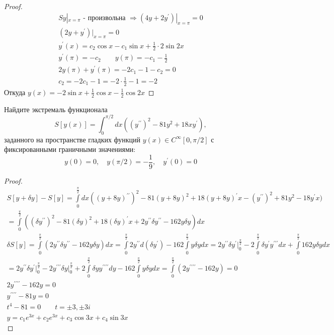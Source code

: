 \begin{proof}
\begin{gather*}
    Sy|_{x = \pi} \text{ - произвольна } \Rightarrow (4y + 2y^{\prime})|_{x = \pi} = 0\\
    (2y + y^{\prime})|_{x = \pi} = 0\\
    y^{\prime}(x) = c_2 \cos x - c_1 \sin x + \frac{1}{2} \cdot 2 \sin 2x\\
    y^{\prime}(\pi) = -c_2\qquad y(\pi) = -c_1 - \frac{1}{2}\\
    2y(\pi) + y^{\prime}(\pi) = -2c_1 - 1 - c_2 = 0\\
    c_2 = -2c_1 - 1= -2 \cdot \frac{1}{2} - 1 = -2
\end{gather*}
Откуда $y(x) = -2\sin x + \frac{1}{2} \cos x - \frac{1}{2} \cos 2x$
\end{proof}
\vskip 0.6in





\begin{prob}
Найдите экстремаль функционала
$$
S[y(x)]=\int_0^{\pi / 2} d x\left(\left(y^{\prime \prime}\right)^2-81 y^2+18 x y^{\prime}\right),
$$
заданного на пространстве гладких функций $y(x) \in C^{\infty}[0, \pi / 2]$ с фиксированными граничными значениями:
$$
y(0) = 0, \quad
y(\pi / 2) = -\frac{1}{9}, \quad
y^{\prime}(0) = 0
$$
\end{prob}

\begin{proof}
\begin{gather*}
    S[y + \delta y] - S[y]
    = \int\limits_{0}^{\frac{\pi}{2}} dx ((y + 8y)^{\prime\prime})^2 - 81(y + 8y)^2 + 18(y+8y)^{\prime}x - (y^{\prime\prime})^2 + 81y^2 - 18y^{\prime}x)\\
    = \int\limits_{0}^{\frac{\pi}{2}} ((\delta y^{\prime \prime})^2 - 81(\delta y)^2 + 18(\delta y)^{\prime} x + 2y^{\prime\prime} \delta y^{\prime\prime} - 162y \delta y )dx\\
    \delta S[y]
    = \int\limits_{0}^{\frac{\pi}{2}} (2y^{\prime\prime} \delta y^{\prime\prime} - 162 y \delta y)dx
    = \int\limits_{0}^{\frac{\pi}{2}} 2y^{\prime\prime} d(\delta y^{\prime}) - 162 \int\limits_{0}^{\frac{\pi}{2}} y \delta y dx
    = 2y^{\prime\prime} \delta y^{\prime} \bigg|_{0}^{\frac{\pi}{2}}
    - 2\int\limits_{0}^{\frac{\pi}{2}} \delta y^{\prime} y^{\prime\prime\prime} dx
    + \int\limits_{0}^{\frac{\pi}{2}} 162 y \delta y dx\\
    = 2y^{\prime\prime} \delta y^{\prime} \bigg|_{0}^{\frac{\pi}{2}}
    - 2y^{\prime\prime\prime} \delta y |_{0}^{\frac{\pi}{2}}
    + 2\int\limits_{0}^{\frac{\pi}{2}} \delta y y^{\prime\prime\prime\prime} dy
    - 162\int\limits_{0}^{\frac{\pi}{2}} y \delta y dx
    = \int\limits_{0}^{\frac{\pi}{2}} (2y^{\prime\prime\prime\prime} - 162y) = 0\\
    2y^{\prime\prime\prime\prime} - 162y = 0\\
    y^{\prime\prime\prime\prime} - 81y = 0\\
    t^4 - 81 = 0\qquad t = \pm 3, \pm 3i\\
    y = c_1 e^{3x} + c_2 e^{3x} + c_3 \cos 3x + c_4 \sin 3x
\end{gather*}
\end{proof}
\vskip 0.6in





